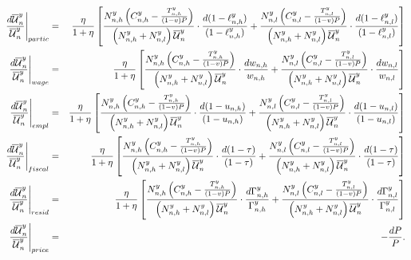 \documentclass[a4paper,12pt]{article}
\begin{document}
\begin{eqnarray*}
\left. \frac{d\overline{\mathcal{U}}_{n}^{y}}{\overline{\mathcal{U}}_{n}^{y}}\right \vert_{partic} &=&\frac{\eta}{1+\eta} \left[
\frac{N_{n,h}^{y}\left( C_{n,h}^{y}-\frac{T_{n,h}^{y}}{(1-v)P}\right) }{\left(
N_{n,h}^{y}+N_{n,l}^{y}\right) \overline{\mathcal{U}}_{n}^{y}}\cdot \frac{d(1-\ell_{n,h}^{y})}{(1-\ell _{n,h}^{y})}+\frac{N_{n,l}^{y}\left(
C_{n,l}^{y}-\frac{T_{n,l}^{y}}{(1-v)P}\right) }{\left( N_{n,h}^{y}+N_{n,l}^{y}\right) 
\overline{\mathcal{U}}_{n}^{y}}\cdot \frac{d(1-\ell _{n,l}^{y})}{(1-\ell _{n,l}^{y})} \right] \\
\left. \frac{d\overline{\mathcal{U}}_{n}^{y}}{\overline{\mathcal{U}}_{n}^{y}}\right \vert_{wage}
&=&\frac{\eta}{1+\eta} \left[
\frac{N_{n,h}^{y}\left( C_{n,h}^{y}-\frac{T_{n,h}^{y}}{(1-v)P}\right) }{\left(
N_{n,h}^{y}+N_{n,l}^{y}\right) \overline{\mathcal{U}}_{n}^{y}}\cdot \frac{dw_{n,h}}{%
w_{n,h}}+\frac{N_{n,l}^{y}\left( C_{n,l}^{y}-\frac{T_{n,l}^{y}}{(1-v)P}\right) }{\left(
N_{n,h}^{y}+N_{n,l}^{y}\right) \overline{\mathcal{U}}_{n}^{y}}\cdot \frac{dw_{n,l}}{%
w_{n,l}} \right] \\
\left. \frac{d\overline{\mathcal{U}}_{n}^{y}}{\overline{\mathcal{U}}_{n}^{y}}\right \vert_{empl}
&=& \frac{\eta}{1+\eta} \left[
\frac{N_{n,h}^{y}\left( C_{n,h}^{y}-\frac{T_{n,h}^{y}}{(1-v)P}\right) }{\left(
N_{n,h}^{y}+N_{n,l}^{y}\right) \overline{\mathcal{U}}_{n}^{y}}\cdot \frac{d(1-u_{n,h})%
}{(1-u_{n,h})}+\frac{N_{n,l}^{y}\left( C_{n,l}^{y}-\frac{T_{n,l}^{y}}{(1-v)P}\right) }{%
\left( N_{n,h}^{y}+N_{n,l}^{y}\right) \overline{\mathcal{U}}_{n}^{y}}\cdot \frac{%
d(1-u_{n,l})}{(1-u_{n,l})} \right] \\
\left. \frac{d\overline{\mathcal{U}}_{n}^{y}}{\overline{\mathcal{U}}_{n}^{y}}\right \vert_{fiscal} &=&\frac{\eta}{1+\eta} \left[
\frac{N_{n,h}^{y}\left( C_{n,h}^{y}-\frac{T_{n,h}^{y}}{(1-v)P}\right) }{\left(
N_{n,h}^{y}+N_{n,l}^{y}\right) \overline{\mathcal{U}}_{n}^{y}}\cdot \frac{d(1-\tau )}{%
(1-\tau )}+\frac{N_{n,l}^{y}\left( C_{n,l}^{y}-\frac{T_{n,l}^{y}}{(1-v)P}\right) }{\left(
N_{n,h}^{y}+N_{n,l}^{y}\right) \overline{\mathcal{U}}_{n}^{y}}\cdot \frac{d(1-\tau )}{%
(1-\tau )} \right] \\
\left. \frac{d\overline{\mathcal{U}}_{n}^{y}}{\overline{\mathcal{U}}_{n}^{y}}\right \vert_{resid} &=&\frac{\eta}{1+\eta} \left[
\frac{N_{n,h}^{y}\left( C_{n,h}^{y}-\frac{T_{n,h}^{y}}{(1-v)P}\right) }{\left(
N_{n,h}^{y}+N_{n,l}^{y}\right) \overline{\mathcal{U}}_{n}^{y}}\cdot \frac{d\Gamma
_{n,h}^{y}}{\Gamma _{n,h}^{y}}+\frac{N_{n,l}^{y}\left(
C_{n,l}^{y}-\frac{T_{n,l}^{y}}{(1-v)P}\right) }{\left( N_{n,h}^{y}+N_{n,l}^{y}\right) 
\overline{\mathcal{U}}_{n}^{y}}\cdot \frac{d\Gamma _{n,l}^{y}}{\Gamma _{n,l}^{y}} \right] \\
\left. \frac{d\overline{\mathcal{U}}_{n}^{y}}{\overline{\mathcal{U}}_{n}^{y}}\right \vert_{price} &=&
-\frac{dP}{P}.
\end{eqnarray*}
\end{document}
